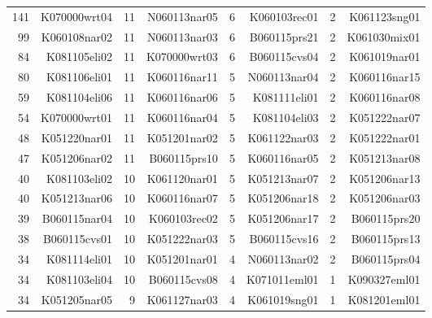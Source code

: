 \begin{table}[p]
\begin{tabular}{rrrrrrrr}
141 &\ttfamily K070000wrt04 &11  &\ttfamily  N060113nar05 &6 & \ttfamily K060103rec01 & 2 &\ttfamily K061123sng01\ttfamily \\
 99 &\ttfamily K060108nar02 &11  &\ttfamily  N060113nar03 &6 & \ttfamily B060115prs21 & 2 &\ttfamily K061030mix01\ttfamily \\
 84 &\ttfamily K081105eli02 &11  &\ttfamily  K070000wrt03 &6 & \ttfamily B060115cvs04 & 2 &\ttfamily K061019nar01\ttfamily \\
 80 &\ttfamily K081106eli01 &11  &\ttfamily  K060116nar11 &5 & \ttfamily N060113nar04 & 2 &\ttfamily K060116nar15\ttfamily \\
 59 &\ttfamily K081104eli06 &11  &\ttfamily  K060116nar06 &5 & \ttfamily K081111eli01 & 2 &\ttfamily K060116nar08\ttfamily \\
 54 &\ttfamily K070000wrt01 &11  &\ttfamily  K060116nar04 &5 & \ttfamily K081104eli03 & 2 &\ttfamily K051222nar07\ttfamily \\
 48 &\ttfamily K051220nar01 &11  &\ttfamily  K051201nar02 &5 & \ttfamily K061122nar03 & 2 &\ttfamily K051222nar01\ttfamily \\
 47 &\ttfamily K051206nar02 &11  &\ttfamily  B060115prs10 &5 & \ttfamily K060116nar05 & 2 &\ttfamily K051213nar08\ttfamily \\
 40 &\ttfamily K081103eli02 &10  &\ttfamily  K061120nar01 &5 & \ttfamily K051213nar07 & 2 &\ttfamily K051206nar13\ttfamily \\
 40 &\ttfamily K051213nar06 &10  &\ttfamily  K060116nar07 &5 & \ttfamily K051206nar18 & 2 &\ttfamily K051206nar03\ttfamily \\
 39 &\ttfamily B060115nar04 &10  &\ttfamily  K060103rec02 &5 & \ttfamily K051206nar17 & 2 &\ttfamily B060115prs20\ttfamily \\
 38 &\ttfamily B060115cvs01 &10  &\ttfamily  K051222nar03 &5 & \ttfamily B060115cvs16 & 2 &\ttfamily B060115prs13\ttfamily \\
 34 &\ttfamily K081114eli01 &10  &\ttfamily  K051201nar01 &4 & \ttfamily N060113nar02 & 2 &\ttfamily B060115prs04\ttfamily \\
 34 &\ttfamily K081103eli04 &10  &\ttfamily  B060115cvs08 &4 & \ttfamily K071011eml01 & 1 &\ttfamily K090327eml01\ttfamily \\
 34 &\ttfamily K051205nar05 & 9  &\ttfamily  K061127nar03 &4 & \ttfamily K061019sng01 & 1 &\ttfamily K081201eml01\ttfamily \\

\end{tabular}
\end{table}
